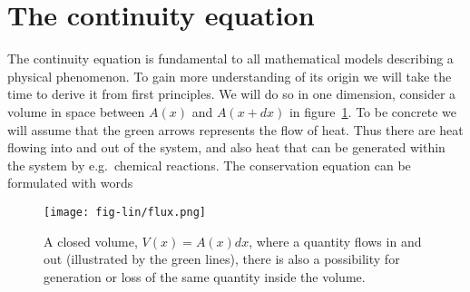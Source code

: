 \documentclass[graybox,sectrefs,envcountresetchap,open=right,final]{svmonodo}
\begin{document}
\section{The continuity equation}
The continuity equation is fundamental to all mathematical models describing a physical phenomenon. To gain more understanding of its origin we will take the time to derive it from first principles. We will do so in one dimension, consider a volume in space between $A(x)$ and $A(x+dx)$ in figure~\ref{fig:lin:flux}. To be concrete we will assume that the green arrows represents the flow of heat. Thus there are heat flowing into and out of the system, and also heat that can be generated within the system by e.g.~chemical reactions. The conservation equation can be formulated with words

\begin{figure}[!ht]  %
  \centerline{\texttt{[image: fig-lin/flux.png]}}
  \caption{
  A closed volume, $V(x)=A(x)dx$, where a quantity flows in and out (illustrated by the green lines), there is also a possibility for generation or loss of the same quantity inside the volume. \label{fig:lin:flux}
  }
\end{figure}
\end{document}
